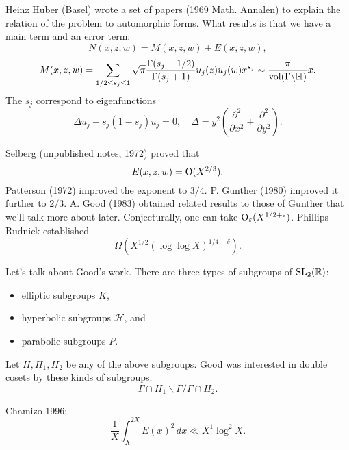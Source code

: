 \documentclass[reqno]{amsart} 
\begin{document}
Heinz Huber (Basel) wrote a set of papers (1969 Math. Annalen) to explain the relation of the problem to automorphic forms.  What results is that we have a main term and an error term:
\begin{equation*}
  N (x, z, w) = M (x, z, w ) + E (x, z, w),
\end{equation*}
\begin{equation*}
  M (x, z, w) = \sum_{1/2 \leq s_j \leq 1} \sqrt{\pi }
  \frac{\Gamma (s_j - 1/2)}{\Gamma (s_j + 1)}
  u_j (z) u_j (w) x^{s_j }
  \sim \frac{\pi }{\operatorname{vol} (\Gamma \backslash \mathbb{H} )}  x.
\end{equation*}
The $s_j$ correspond to eigenfunctions
\begin{equation*}
  \Delta u_j + s_j (1 - s_j ) u_j = 0, \quad
  \Delta = y^2 \left( \frac{\partial^2 }{ \partial x^2 } + \frac{\partial^2 }{ \partial y^2 } \right).
\end{equation*}

Selberg (unpublished notes, 1972) proved that
\begin{equation*}
  E (x, z, w) = \operatorname{O}(X^{2/3} ).
\end{equation*}
Patterson (1972) improved the exponent to $3/4$.  P. Gunther (1980) improved it further to $2/3$.  A. Good (1983) obtained related results to those of Gunther that we'll talk more about later.  Conjecturally, one can take $\operatorname{O}_\varepsilon (X^{1/2 + \varepsilon })$.  Phillips--Rudnick  established
\begin{equation*}
\Omega \left( X^{1/2} (\log \log X )^{1/4 - \delta } \right).
\end{equation*}

Let's talk about Good's work.  There are three types of subgroups of $\operatorname{SL}_2(\mathbb{R})$:
\begin{itemize}
\item elliptic subgroups $K$,
\item hyperbolic subgroups $\mathcal{H}$, and
\item parabolic subgroups $P$.
\end{itemize}
Let $H, H_1, H_2$ be any of the above subgroups.  Good was interested in double cosets by these kinds of subgroups:
\begin{equation*}
  \Gamma \cap H_1 \backslash \Gamma / \Gamma \cap H_2.
\end{equation*}

Chamizo 1996:
\begin{equation*}
\frac{1}{X} \int_X^{2 X } E (x)^2 \, d x \ll X^1 \log^2 X.
\end{equation*}
\end{document}
